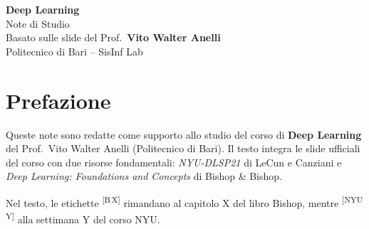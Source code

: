 \documentclass[12pt, a4paper]{report}
\begin{document}
\begin{titlepage}
  \centering
  \vspace*{2cm}
  {\LARGE\bfseries Deep Learning}\\[0.5cm]
  {\large Note di Studio}\\[1.5cm]
  {\normalsize Basato sulle slide del Prof.\ \textbf{Vito Walter Anelli}\\
  Politecnico di Bari -- SisInf Lab}\\[1cm]
\end{titlepage}

\chapter*{Prefazione}

Queste note sono redatte come supporto allo studio del corso di
\textbf{Deep Learning} del Prof.\ Vito Walter Anelli (Politecnico di Bari).
Il testo integra le slide ufficiali del corso con due risorse fondamentali:
\textit{NYU-DLSP21} \citep{lecun2021} di LeCun e Canziani e
\textit{Deep Learning: Foundations and Concepts} \citep{bishop2024}
di Bishop \& Bishop.

Nel testo, le etichette \textsuperscript{[B\,X]} rimandano al capitolo X del
libro Bishop, mentre \textsuperscript{[NYU\,Y]} alla settimana Y del corso NYU.

\tableofcontents
\newpage





















% 
% 



\end{document}
